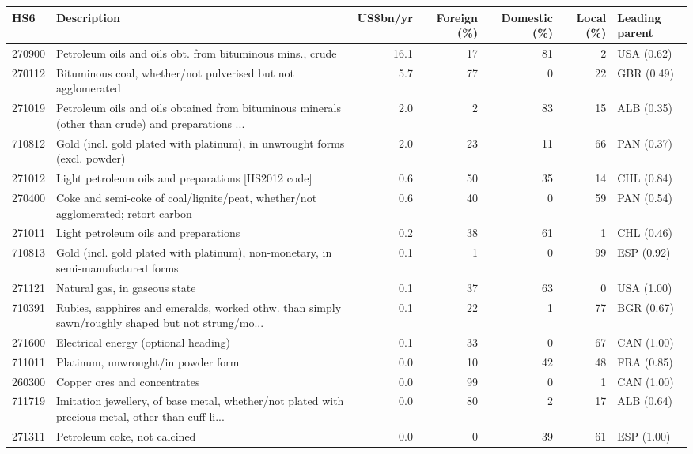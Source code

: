 \begin{tabular}{@{}l p{6.4cm} r r r r l@{}}
\toprule
HS6 & Description & US\$bn/yr & Foreign (\%) & Domestic (\%) & Local (\%) & Leading parent \\
\midrule
270900 & Petroleum oils and oils obt. from bituminous mins., crude & 16.1 & 17 & 81 & 2 & USA (0.62) \\
270112 & Bituminous coal, whether/\allowbreak{}not pulverised but not agglomerated & 5.7 & 77 & 0 & 22 & GBR (0.49) \\
271019 & Petroleum oils and oils obtained from bituminous minerals (other than crude) and preparations ... & 2.0 & 2 & 83 & 15 & ALB (0.35) \\
710812 & Gold (incl. gold plated with platinum), in unwrought forms (excl. powder) & 2.0 & 23 & 11 & 66 & PAN (0.37) \\
271012 & Light petroleum oils and preparations [HS2012 code] & 0.6 & 50 & 35 & 14 & CHL (0.84) \\
270400 & Coke and semi-coke of coal/\allowbreak{}lignite/\allowbreak{}peat, whether/\allowbreak{}not agglomerated; retort carbon & 0.6 & 40 & 0 & 59 & PAN (0.54) \\
271011 & Light petroleum oils and preparations & 0.2 & 38 & 61 & 1 & CHL (0.46) \\
710813 & Gold (incl. gold plated with platinum), non-monetary, in semi-manufactured forms & 0.1 & 1 & 0 & 99 & ESP (0.92) \\
271121 & Natural gas, in gaseous state & 0.1 & 37 & 63 & 0 & USA (1.00) \\
710391 & Rubies, sapphires and emeralds, worked othw. than simply sawn/\allowbreak{}roughly shaped but not strung/\allowbreak{}mo... & 0.1 & 22 & 1 & 77 & BGR (0.67) \\
271600 & Electrical energy (optional heading) & 0.1 & 33 & 0 & 67 & CAN (1.00) \\
711011 & Platinum, unwrought/\allowbreak{}in powder form & 0.0 & 10 & 42 & 48 & FRA (0.85) \\
260300 & Copper ores and concentrates & 0.0 & 99 & 0 & 1 & CAN (1.00) \\
711719 & Imitation jewellery, of base metal, whether/\allowbreak{}not plated with precious metal, other than cuff-li... & 0.0 & 80 & 2 & 17 & ALB (0.64) \\
271311 & Petroleum coke, not calcined & 0.0 & 0 & 39 & 61 & ESP (1.00) \\
\bottomrule
\end{tabular}

